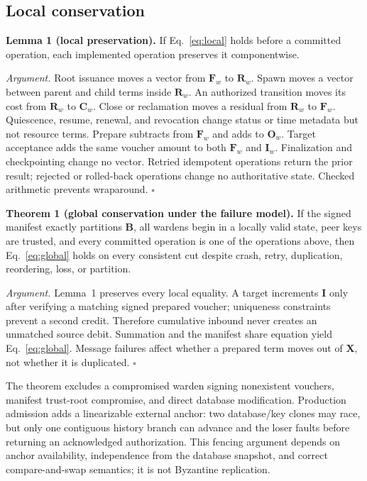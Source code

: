 \documentclass[10pt]{article}
\newcommand{\vect}[1]{\boldsymbol{#1}}
\begin{document}
\subsection{Local conservation}

\textbf{Lemma 1 (local preservation).} If Eq.~\ref{eq:local} holds before a committed operation,
each implemented operation preserves it componentwise.

\textit{Argument.} Root issuance moves a vector from $\vect{F}_w$ to $\vect{R}_w$. Spawn moves a
vector between parent and child terms inside $\vect{R}_w$. An authorized transition moves its cost
from $\vect{R}_w$ to $\vect{C}_w$. Close or reclamation moves a residual from $\vect{R}_w$ to
$\vect{F}_w$. Quiescence, resume, renewal, and revocation change status or time metadata but not
resource terms. Prepare subtracts from $\vect{F}_w$ and adds to $\vect{O}_w$. Target acceptance
adds the same voucher amount to both $\vect{F}_w$ and $\vect{I}_w$. Finalization and checkpointing
change no vector. Retried idempotent operations return the prior result; rejected or rolled-back
operations change no authoritative state. Checked arithmetic prevents wraparound. \hfill$\square$

\textbf{Theorem 1 (global conservation under the failure model).} If the signed manifest exactly
partitions $\vect{B}$, all wardens begin in a locally valid state, peer keys are trusted, and every
committed operation is one of the operations above, then Eq.~\ref{eq:global} holds on every
consistent cut despite crash, retry, duplication, reordering, loss, or partition.

\textit{Argument.} Lemma~1 preserves every local equality. A target increments $\vect{I}$ only
after verifying a matching signed prepared voucher; uniqueness constraints prevent a second
credit. Therefore cumulative inbound never creates an unmatched source debit. Summation and the
manifest share equation yield Eq.~\ref{eq:global}. Message failures affect whether a prepared term
moves out of $\vect{X}$, not whether it is duplicated. \hfill$\square$

The theorem excludes a compromised warden signing nonexistent vouchers, manifest trust-root
compromise, and direct database modification. Production admission adds a linearizable external
anchor: two database/key clones may race, but only one contiguous history branch can advance and
the loser faults before returning an acknowledged authorization. This fencing argument depends on
anchor availability, independence from the database snapshot, and correct compare-and-swap
semantics; it is not Byzantine replication.
\end{document}
